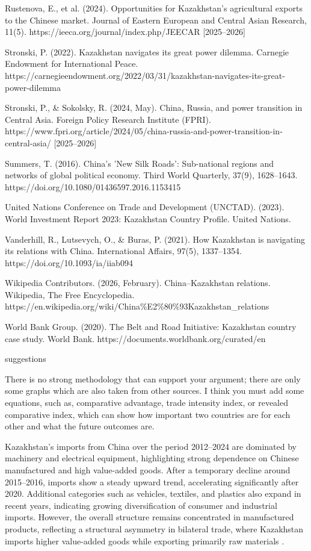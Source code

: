 \documentclass[12pt]{article}
\begin{document}
Rustenova, E., et al. (2024). Opportunities for Kazakhstan's agricultural exports to the Chinese market. Journal of Eastern European and Central Asian Research, 11(5). https://ieeca.org/journal/index.php/JEECAR [2025--2026]\par
Stronski, P. (2022). Kazakhstan navigates its great power dilemma. Carnegie Endowment for International Peace. https://carnegieendowment.org/2022/03/31/kazakhstan-navigates-its-great-power-dilemma\par
Stronski, P., \& Sokolsky, R. (2024, May). China, Russia, and power transition in Central Asia. Foreign Policy Research Institute (FPRI). https://www.fpri.org/article/2024/05/china-russia-and-power-transition-in-central-asia/ [2025--2026]\par
Summers, T. (2016). China's 'New Silk Roads': Sub-national regions and networks of global political economy. Third World Quarterly, 37(9), 1628--1643. https://doi.org/10.1080/01436597.2016.1153415\par
United Nations Conference on Trade and Development (UNCTAD). (2023). World Investment Report 2023: Kazakhstan Country Profile. United Nations.\par
Vanderhill, R., Lutsevych, O., \& Buras, P. (2021). How Kazakhstan is navigating its relations with China. International Affairs, 97(5), 1337--1354. https://doi.org/10.1093/ia/iiab094\par
Wikipedia Contributors. (2026, February). China--Kazakhstan relations. Wikipedia, The Free Encyclopedia. https://en.wikipedia.org/wiki/China\%E2\%80\%93Kazakhstan\_relations\par
World Bank Group. (2020). The Belt and Road Initiative: Kazakhstan country case study. World Bank. https://documents.worldbank.org/curated/en\par

suggestions\par
There is no strong methodology that can support your argument; there are only some graphs which are also taken from other sources. I think you must add some equations, such as, comparative advantage, trade intensity index, or revealed comparative index, which can show how important two countries are for each other and what the future outcomes are.\par




Kazakhstan’s imports from China over the period 2012--2024 are dominated by machinery and electrical equipment, highlighting strong dependence on Chinese manufactured and high value-added goods. After a temporary decline around 2015--2016, imports show a steady upward trend, accelerating significantly after 2020. Additional categories such as vehicles, textiles, and plastics also expand in recent years, indicating growing diversification of consumer and industrial imports. However, the overall structure remains concentrated in manufactured products, reflecting a structural asymmetry in bilateral trade, where Kazakhstan imports higher value-added goods while exporting primarily raw materials .\par
\end{document}
